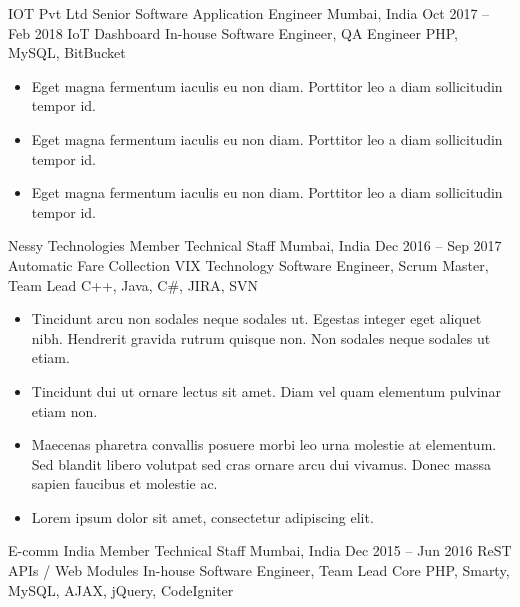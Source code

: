 \documentclass[10pt, a4paper]{sivu}
\begin{document}
\smallskip
\divider
\smallskip


    \company
        {IOT Pvt Ltd}
        {Senior Software Application Engineer}
        {Mumbai, India}
        {Oct 2017 – Feb 2018}
        \project
        {IoT Dashboard}
        {In-house}
        {Software Engineer, QA Engineer}
        {PHP, MySQL, BitBucket}
        
        \begin{itemize}
            \item Eget magna fermentum iaculis eu non diam. Porttitor leo a diam sollicitudin tempor id. \smallskip
            \item Eget magna fermentum iaculis eu non diam. Porttitor leo a diam sollicitudin tempor id.\smallskip
            \item Eget magna fermentum iaculis eu non diam. Porttitor leo a diam sollicitudin tempor id.\smallskip
        \end{itemize}

\smallskip
\divider
\smallskip

    \company
        {Nessy Technologies}
        {Member Technical Staff}
        {Mumbai, India}
        {Dec 2016 – Sep 2017}
        \project
            {Automatic Fare Collection}
            {VIX Technology}
            {Software Engineer, Scrum Master, Team Lead}
            {C++, Java, C\#, JIRA, SVN}
        
        \begin{itemize}
            \item  Tincidunt arcu non sodales neque sodales ut. Egestas integer eget aliquet nibh. Hendrerit gravida rutrum quisque non. Non sodales neque sodales ut etiam. \smallskip
            \item  Tincidunt dui ut ornare lectus sit amet. Diam vel quam elementum pulvinar etiam non. \smallskip
            \item  Maecenas pharetra convallis posuere morbi leo urna molestie at elementum. Sed blandit libero volutpat sed cras ornare arcu dui vivamus. Donec massa sapien faucibus et molestie ac.\smallskip
            \item  Lorem ipsum dolor sit amet, consectetur adipiscing elit. \smallskip
        \end{itemize}

\smallskip
\divider
\smallskip

    \company
        {E-comm India}
        {Member Technical Staff}
        {Mumbai, India}
        {Dec 2015 – Jun 2016}
        \project
        {ReST APIs / Web Modules}
        {In-house}
        {Software Engineer, Team Lead}
        {Core PHP, Smarty, MySQL, AJAX, jQuery, CodeIgniter}
        
\end{document}
